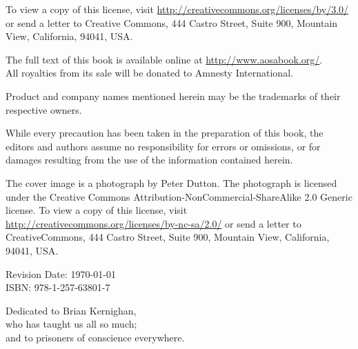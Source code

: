 \noindent To view a copy of this license, visit
\url{http://creativecommons.org/licenses/by/3.0/} or send a letter to Creative
Commons, 444 Castro Street, Suite 900, Mountain View, California,
94041, USA.\\

\vspace{0.15cm}

\noindent
The full text of this book is available online at \url{http://www.aosabook.org/}.\\
All royalties from its sale will be donated to Amnesty International.\\

\vfill

\noindent Product and company names mentioned herein may be the trademarks of
their respective owners.\\

\vspace{0.15cm}

\noindent While every precaution has been taken in the preparation of this
book, the editors and authors assume no responsibility for errors or omissions,
or for damages resulting from the use of the information contained herein.\\

\vspace{0.15cm}

\noindent The cover image is a photograph by Peter Dutton. The photograph is
licensed under the Creative Commons Attribution-NonCommercial-ShareAlike 2.0
Generic license. To view a copy of this license, visit
\url{http://creativecommons.org/licenses/by-nc-sa/2.0/} or send a letter to
CreativeCommons, 444 Castro Street, Suite 900, Mountain View, California,
94041, USA. \\

\vspace{1cm}

\noindent Revision Date: \today \\

\noindent ISBN: 978-1-257-63801-7
\normalsize

\newpage

\thispagestyle{empty}

\vspace*{5cm}
\begin{center}
\hspace{0cm}Dedicated to Brian Kernighan,\\
who has taught us all so much;\\
and to prisoners of conscience everywhere.
\end{center}

\newpage

\thispagestyle{empty}
\mbox{}    %

